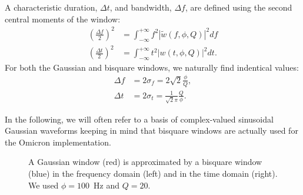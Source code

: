 A characteristic duration, $\Delta t$, and bandwidth, $\Delta f$, are defined using the second central moments of the window:
\begin{align}
  \left(\frac{\Delta f}{2}\right)^2 &= \int_{-\infty}^{+\infty}{f^2|\tilde{w}(f,\phi,Q)|^2 df}\\
  \left(\frac{\Delta t}{2}\right)^2 &= \int_{-\infty}^{+\infty}{t^2|w(t,\phi,Q)|^2 dt}.
\end{align}
For both the Gaussian and bisquare windows, we naturally find indentical values:
\begin{align}
  \Delta f &=  2\sigma_f = 2\sqrt{2}\frac{\phi}{Q}, \\ 
  \Delta t &=  2\sigma_t = \frac{1}{\sqrt{2}\pi}\frac{Q}{\phi}.
\end{align}

In the following, we will often refer to a basis of complex-valued sinusoidal Gaussian waveforms keeping in mind that bisquare windows are actually used for the Omicron implementation.

\begin{figure}
  \center
  \caption{A Gaussian window (red) is approximated by a bisquare window (blue) in the frequency domain (left) and in the time domain (right). We used $\phi=100$~Hz and $Q=20$.}
  \label{fig:window}
\end{figure}

